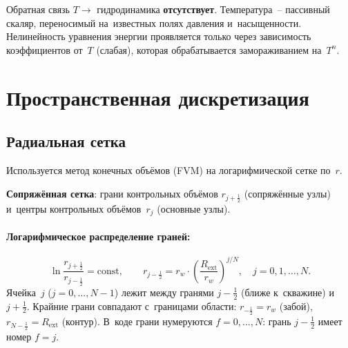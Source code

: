 \documentclass[12pt,a4paper]{article}
\newcommand{\half}{\tfrac{1}{2}}
\newcommand{\rw}{r_w}
\newcommand{\Rext}{R_{\mathrm{ext}}}
\begin{document}
Обратная связь $T \to$ гидродинамика \textbf{отсутствует}. Температура~--
пассивный скаляр, переносимый на~известных полях давления
и~насыщенности. Нелинейность уравнения энергии проявляется только
через зависимость коэффициентов от~$T$ (слабая), которая
обрабатывается замораживанием на~$T^n$.


\section{Пространственная дискретизация}\label{sec:discretization}

\subsection{Радиальная сетка}\label{ssec:grid}

Используется метод конечных объёмов (FVM) на логарифмической сетке по~$r$.

\textbf{Сопряжённая сетка}: грани контрольных объёмов $r_{j+\half}$
(сопряжённые узлы) и~центры контрольных объёмов~$r_j$ (основные узлы).

\paragraph{Логарифмическое распределение граней:}
\begin{equation}\label{eq:log_grid}
  \ln\frac{r_{j+\half}}{r_{j-\half}} = \mathrm{const},
  \qquad
  r_{j-\half} = \rw \cdot \left(\frac{\Rext}{\rw}\right)^{j/N},
  \quad j = 0, 1, \ldots, N.
\end{equation}
Ячейка~$j$ ($j = 0, \ldots, N-1$) лежит между гранями ${j-\half}$ (ближе
к~скважине) и~${j+\half}$. Крайние грани совпадают с~границами области:
$r_{-\half} = \rw$ (забой), $r_{N-\half} = \Rext$ (контур). В~коде грани
нумеруются $f = 0, \ldots, N$: грань ${j-\half}$ имеет номер $f = j$.
\end{document}
